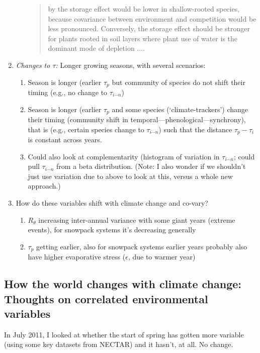 \documentclass[11pt,a4paper,oneside]{article}
\begin{document}
\begin{enumerate}
\begin{enumerate}
\begin{quote}
by the storage effect would be lower in shallow-rooted
species, because covariance between environment and competition would be less pronounced. Conversely, the
storage effect should be stronger for plants rooted in soil
layers where plant use of water is the dominant mode of
depletion ....
\end{quote}
\end{enumerate}
\item \emph{Changes to \(\tau\):} Longer growing seasons, with several scenarios:
\begin{enumerate}
\item Season is longer (earlier \(\tau_{p}\) but community of species
  do not shift their timing (e.g., no change to  \(\tau_{i \cdots
    n}\)) 
\item Season is longer (earlier \(\tau_{p}\) and some species (`climate-trackers') change
  their timing (community shift in temporal---phenological---synchrony),
  that is (e.g., certain species change to  \(\tau_{i \cdots
    n}\)) such that the distance \(\tau_{p}-\tau_{i}\) is constant
  across years.
\item Could also look at complementarity (histogram of variation in \(\tau_{i \cdots
    n}\); could pull \(\tau_{i \cdots
    n}\) from a beta distribution. (Note: I also wonder if we
  shouldn't just use variation due to above to look at this, versus a
  whole new approach.)
\end{enumerate}
\item How do these variables shift with climate change and co-vary?
\begin{enumerate} 
\item \(R_{\theta}\) increasing inter-annual variance with some giant
  years (extreme events), for snowpack systems it's decreasing
  generally
\item \(\tau_{p}\) getting earlier, also for snowpack systems earlier
  years probably also have higher evaporative stress (\(\epsilon\),
  due to warmer year)
\end{enumerate}
\end{enumerate}


\subsection{How the world changes with climate change: Thoughts on correlated environmental variables}

\noindent In July 2011, I looked at whether the start of spring
has gotten more variable (using some key datasets from NECTAR) and it
hasn't, at all. No change.\\
\end{document}
